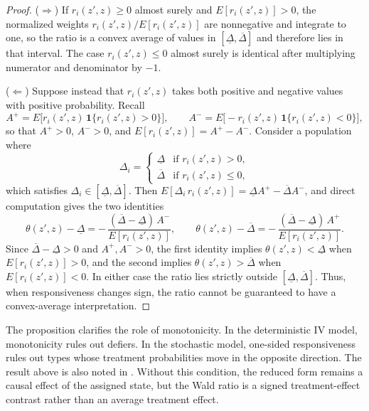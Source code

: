 \documentclass[11pt]{article}
\newcommand{\1}{\mathbf{1}}
\begin{document}
\begin{proof}
($\Rightarrow$) If $r_i(z',z) \geq 0$ almost surely and $E[r_i(z',z)] > 0$,
the normalized weights $r_i(z',z)/E[r_i(z',z)]$ are nonnegative and integrate
to one, so the ratio is a convex average of values in
$[\underline{\Delta}, \overline{\Delta}]$ and therefore lies in that interval.
The case $r_i(z',z) \leq 0$ almost surely is identical after multiplying
numerator and denominator by $-1$.

($\Leftarrow$) Suppose instead that $r_i(z',z)$ takes both positive and
negative values with positive probability. Recall
\[
A^+ = E\big[r_i(z',z)\,\mathbf{1}\{r_i(z',z) > 0\}\big],
\qquad
A^- = E\big[-r_i(z',z)\,\mathbf{1}\{r_i(z',z) < 0\}\big],
\]
so that $A^+ > 0$, $A^- > 0$, and $E[r_i(z',z)] = A^+ - A^-$. Consider a population where
\[
\Delta_i =
\begin{cases}
\underline{\Delta} & \text{if } r_i(z',z) > 0,\\[2pt]
\overline{\Delta} & \text{if } r_i(z',z) \leq 0,
\end{cases}
\]
which satisfies $\Delta_i \in [\underline{\Delta}, \overline{\Delta}]$. Then
$E[\Delta_i\, r_i(z',z)] = \underline{\Delta}A^+ - \overline{\Delta}A^-$, and
direct computation gives the two identities
\[
\theta(z',z) - \underline{\Delta}
= -\,\frac{(\overline{\Delta}-\underline{\Delta})\,A^-}{E[r_i(z',z)]},
\qquad
\theta(z',z) - \overline{\Delta}
= -\,\frac{(\overline{\Delta}-\underline{\Delta})\,A^+}{E[r_i(z',z)]}.
\]
Since $\overline{\Delta} - \underline{\Delta} > 0$ and $A^+, A^- > 0$, the
first identity implies $\theta(z',z) < \underline{\Delta}$ when
$E[r_i(z',z)] > 0$, and the second implies
$\theta(z',z) > \overline{\Delta}$ when $E[r_i(z',z)] < 0$. In either case
the ratio lies strictly outside $[\underline{\Delta}, \overline{\Delta}]$.
Thus, when responsiveness changes sign, the ratio cannot be guaranteed to
have a convex-average interpretation.
\end{proof}



The proposition clarifies the role of monotonicity. In the deterministic IV model,
monotonicity rules out defiers. In the stochastic model, one-sided responsiveness rules
out types whose treatment probabilities move in the opposite direction. The result above is also noted in \cite{dinardolee2011}.  Without this
condition, the reduced form remains a causal effect of the assigned state, but the Wald
ratio is a signed treatment-effect contrast rather than an average treatment effect.
\end{document}
